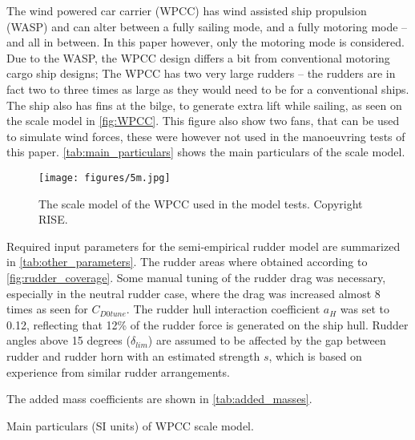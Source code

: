 The wind powered car carrier (WPCC) has wind assisted ship propulsion (WASP) and can alter between a fully sailing mode, and a fully motoring mode -- and all in between. 
In this paper however, only the motoring mode is considered. Due to the WASP, the WPCC design differs a bit from conventional motoring cargo ship designs; The WPCC has two very large rudders -- the rudders are in fact two to three times as large as they would need to be for a conventional ships. The ship also has fins at the bilge, to generate extra lift while sailing, as seen on the scale model in \autoref{fig:WPCC}. This figure also show two fans, that can be used to simulate wind forces, these were however not used in the manoeuvring tests of this paper. \autoref{tab:main_particulars} shows the main particulars of the scale model. 
\begin{figure}[h]
    \centering
    \texttt{[image: figures/5m.jpg]}
    \caption{The scale model of the WPCC used in the model tests. Copyright RISE.}
    \label{fig:WPCC}
\end{figure}

Required input parameters for the semi-empirical rudder model are summarized in \autoref{tab:other_parameters}.
The rudder areas where obtained according to \autoref{fig:rudder_coverage}.   
Some manual tuning of the rudder drag was necessary, especially in the neutral rudder case, where the drag was increased almost 8 times as seen for $C_{D0tune}$. The rudder hull interaction coefficient $a_H$ was set to 0.12, reflecting that 12\% of the rudder force is generated on the ship hull.
Rudder angles above 15 degrees ($\delta_{lim}$) are assumed to be affected by the gap between rudder and rudder horn with an estimated strength $s$, which is based on experience from similar rudder arrangements.

The added mass coefficients are shown in \autoref{tab:added_masses}.
\begin{table}[h]
    \centering
    \caption{Main particulars (SI units) of WPCC scale model.}
    \label{tab:main_particulars}
\end{table}